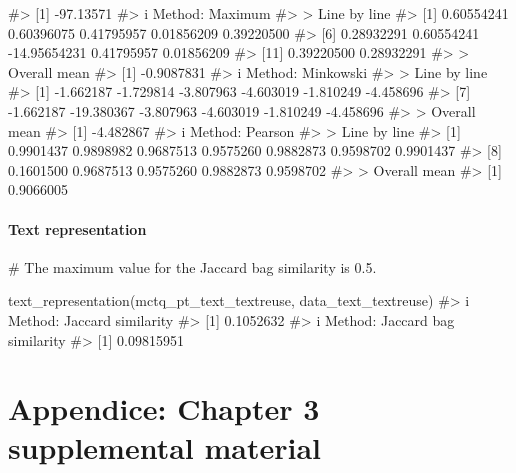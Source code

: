 \documentclass[
  12pt,
  a4paper,
  oneside]{tesesusp}
\newenvironment{Shaded}{\begin{snugshade}}{\end{snugshade}}
\newcommand{\CommentTok}[1]{\textcolor[rgb]{0.37,0.37,0.37}{#1}}
\newcommand{\FunctionTok}[1]{\textcolor[rgb]{0.28,0.35,0.67}{#1}}
\newcommand{\NormalTok}[1]{\textcolor[rgb]{0.00,0.23,0.31}{#1}}
\begin{document}
\begin{Shaded}
\begin{Highlighting}[numbers=left,,]
\CommentTok{\#\textgreater{} [1] {-}97.13571}
\CommentTok{\#\textgreater{} i Method: Maximum}
\CommentTok{\#\textgreater{} \textgreater{} Line by line}
\CommentTok{\#\textgreater{}  [1]   0.60554241   0.60396075   0.41795957   0.01856209   0.39220500}
\CommentTok{\#\textgreater{}  [6]   0.28932291   0.60554241 {-}14.95654231   0.41795957   0.01856209}
\CommentTok{\#\textgreater{} [11]   0.39220500   0.28932291}
\CommentTok{\#\textgreater{} \textgreater{} Overall mean}
\CommentTok{\#\textgreater{} [1] {-}0.9087831}
\CommentTok{\#\textgreater{} i Method: Minkowski}
\CommentTok{\#\textgreater{} \textgreater{} Line by line}
\CommentTok{\#\textgreater{}  [1]  {-}1.662187  {-}1.729814  {-}3.807963  {-}4.603019  {-}1.810249  {-}4.458696}
\CommentTok{\#\textgreater{}  [7]  {-}1.662187 {-}19.380367  {-}3.807963  {-}4.603019  {-}1.810249  {-}4.458696}
\CommentTok{\#\textgreater{} \textgreater{} Overall mean}
\CommentTok{\#\textgreater{} [1] {-}4.482867}
\CommentTok{\#\textgreater{} i Method: Pearson}
\CommentTok{\#\textgreater{} \textgreater{} Line by line}
\CommentTok{\#\textgreater{}  [1] 0.9901437 0.9898982 0.9687513 0.9575260 0.9882873 0.9598702 0.9901437}
\CommentTok{\#\textgreater{}  [8] 0.1601500 0.9687513 0.9575260 0.9882873 0.9598702}
\CommentTok{\#\textgreater{} \textgreater{} Overall mean}
\CommentTok{\#\textgreater{} [1] 0.9066005}
\end{Highlighting}
\end{Shaded}

\hypertarget{text-representation-1}{%
\subsubsection{Text representation}\label{text-representation-1}}

\begin{Shaded}
\begin{Highlighting}[numbers=left,,]
\CommentTok{\# The maximum value for the Jaccard bag similarity is 0.5.}

\FunctionTok{text\_representation}\NormalTok{(mctq\_pt\_text\_textreuse, data\_text\_textreuse)}
\CommentTok{\#\textgreater{} i Method: Jaccard similarity}
\CommentTok{\#\textgreater{} [1] 0.1052632}
\CommentTok{\#\textgreater{} i Method: Jaccard bag similarity}
\CommentTok{\#\textgreater{} [1] 0.09815951}
\end{Highlighting}
\end{Shaded}

\hypertarget{appendice-chapter-3-supplemental-material}{%
\chapter{Appendice: Chapter 3 supplemental
material}\label{appendice-chapter-3-supplemental-material}}
\end{document}
